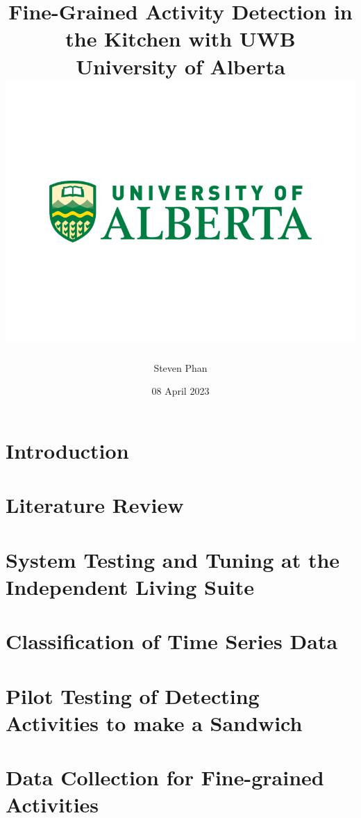 \documentclass[12pt]{report}
\title{
    {Fine-Grained Activity Detection in the Kitchen with UWB}\\
    {\large University of Alberta}\\
    {\includegraphics[width=\textwidth]{university.png}}
}
\author{Steven Phan}
\date{08 April 2023}
\begin{document}
\maketitle


\tableofcontents

\chapter{Introduction}


\chapter{Literature Review}\label{chp2}


\chapter{System Testing and Tuning at the Independent Living Suite}\label{chp3}


\chapter{Classification of Time Series Data}\label{chp4}


\chapter{Pilot Testing of Detecting Activities to make a Sandwich}


\chapter{Data Collection for Fine-grained Activities}\label{chp:pass-tasks}

% 



\end{document}
